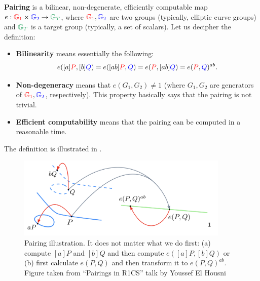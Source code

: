\documentclass[../lecture-notes-148x210.tex]{subfiles}
\begin{document}
\begin{definition}
    \textbf{Pairing} is a bilinear, non-degenerate, efficiently computable map $e: \textcolor{red}{\mathbb{G}_1} \times \textcolor{blue}{\mathbb{G}_2} \to \textcolor{ForestGreen}{\mathbb{G}_T}$, where $\textcolor{red}{\mathbb{G}_1},\textcolor{blue}{\mathbb{G}_2}$ are two groups (typically, elliptic curve groups) and $\textcolor{ForestGreen}{\mathbb{G}_T}$ is a target group (typically, a set of scalars). Let us decipher the definition:
    \begin{itemize}
        \item \textbf{Bilinearity} means essentially the following:
        \begin{equation*}
            e([a]\textcolor{red}{P},[b]\textcolor{blue}{Q}) = e([ab]\textcolor{red}{P},\textcolor{blue}{Q}) = e(\textcolor{red}{P},[ab]\textcolor{blue}{Q}) = e(\textcolor{red}{P},\textcolor{blue}{Q})^{ab}.        
        \end{equation*}
        \item \textbf{Non-degeneracy} means that $e(G_1,G_2) \neq 1$ (where $G_1,G_2$ are generators of $\textcolor{red}{\mathbb{G}_1},\textcolor{blue}{\mathbb{G}_2}$, respectively). This property basically says that the pairing is not trivial.
        \item \textbf{Efficient computability} means that the pairing can be computed in a reasonable time.
    \end{itemize}

    The definition is illustrated in .
\end{definition}

\begin{figure}[H]
    \centering
    \includegraphics[width=0.9\textwidth]{images/lecture_4/pairing.png}
    \caption{Pairing illustration. It does not matter what we do first: (a) compute $[a]P$ and $[b]Q$ and then compute $e([a]P,[b]Q)$ or (b) first calculate $e(P,Q)$ and then transform it to $e(P,Q)^{ab}$. {Figure taken from ``Pairings in R1CS'' talk by Youssef El Housni}}
    \label{fig:ecpairing}
\end{figure}
\end{document}

